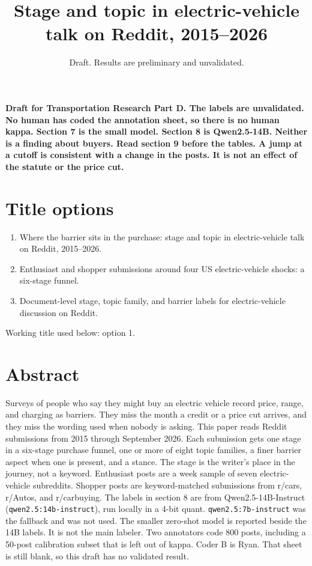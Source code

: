 \documentclass[11pt]{article}
\title{Stage and topic in electric-vehicle talk on Reddit, 2015--2026}
\author{Draft. Results are preliminary and unvalidated.}
\date{}
\begin{document}
\maketitle


\textbf{Draft for Transportation Research Part D. The labels are unvalidated. No human has coded the annotation sheet, so there is no human kappa. Section 7 is the small model. Section 8 is Qwen2.5-14B. Neither is a finding about buyers. Read section 9 before the tables. A jump at a cutoff is consistent with a change in the posts. It is not an effect of the statute or the price cut.}


\section{Title options}

\begin{enumerate}
\item Where the barrier sits in the purchase: stage and topic in electric-vehicle talk on Reddit, 2015–2026.
\item Enthusiast and shopper submissions around four US electric-vehicle shocks: a six-stage funnel.
\item Document-level stage, topic family, and barrier labels for electric-vehicle discussion on Reddit.
\end{enumerate}


Working title used below: option 1.


\section{Abstract}

Surveys of people who say they might buy an electric vehicle record price, range, and charging as barriers. They miss the month a credit or a price cut arrives, and they miss the wording used when nobody is asking. This paper reads Reddit submissions from 2015 through September 2026. Each submission gets one stage in a six-stage purchase funnel, one or more of eight topic families, a finer barrier aspect when one is present, and a stance. The stage is the writer's place in the journey, not a keyword. Enthusiast posts are a week sample of seven electric-vehicle subreddits. Shopper posts are keyword-matched submissions from r/cars, r/Autos, and r/carbuying. The labels in section 8 are from Qwen2.5-14B-Instruct (\texttt{qwen2.5:14b-instruct}), run locally in a 4-bit quant. \texttt{qwen2.5:7b-instruct} was the fallback and was not used. The smaller zero-shot model is reported beside the 14B labels. It is not the main labeler. Two annotators code 800 posts, including a 50-post calibration subset that is left out of kappa. Coder B is Ryan. That sheet is still blank, so this draft has no validated result.
\end{document}
